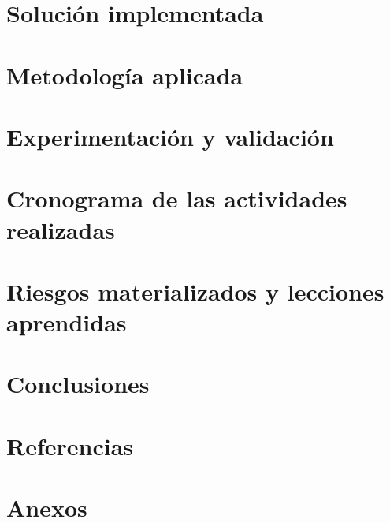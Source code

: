 \documentclass[11pt]{article}
\begin{document}


\section{Solución implementada}



\section{Metodología aplicada}



\section{Experimentación y validación}



\section{Cronograma de las actividades realizadas}



\section{Riesgos materializados y lecciones aprendidas}



\section{Conclusiones}



\section{Referencias}



\section{Anexos}


\end{document}
